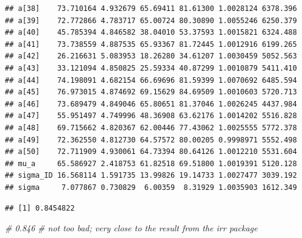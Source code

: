 \documentclass[
]{article}
\newenvironment{Shaded}{\begin{snugshade}}{\end{snugshade}}
\newcommand{\CommentTok}[1]{\textcolor[rgb]{0.56,0.35,0.01}{\textit{#1}}}
\newcommand{\DecValTok}[1]{\textcolor[rgb]{0.00,0.00,0.81}{#1}}
\newcommand{\FloatTok}[1]{\textcolor[rgb]{0.00,0.00,0.81}{#1}}
\newcommand{\FunctionTok}[1]{\textcolor[rgb]{0.13,0.29,0.53}{\textbf{#1}}}
\newcommand{\NormalTok}[1]{#1}
\newcommand{\OtherTok}[1]{\textcolor[rgb]{0.56,0.35,0.01}{#1}}
\newcommand{\SpecialCharTok}[1]{\textcolor[rgb]{0.81,0.36,0.00}{\textbf{#1}}}
\begin{document}
\begin{verbatim}
## a[38]    73.710164 4.932679 65.69411 81.61300 1.0028124 6378.396
## a[39]    72.772866 4.783717 65.00724 80.30890 1.0055246 6250.379
## a[40]    45.785394 4.846582 38.04010 53.37593 1.0015821 6324.488
## a[41]    73.738559 4.887535 65.93367 81.72445 1.0012916 6199.265
## a[42]    26.216631 5.083953 18.26280 34.61207 1.0030459 5052.563
## a[43]    33.121094 4.850825 25.59334 40.87299 1.0010879 5411.410
## a[44]    74.198091 4.682154 66.69696 81.59399 1.0070692 6485.594
## a[45]    76.973015 4.874692 69.15629 84.69509 1.0010603 5720.713
## a[46]    73.689479 4.849046 65.80651 81.37046 1.0026245 4437.984
## a[47]    55.951497 4.749996 48.36908 63.62176 1.0014202 5516.828
## a[48]    69.715662 4.820367 62.00446 77.43062 1.0025555 5772.378
## a[49]    72.362550 4.812730 64.57572 80.00205 0.9998971 5552.498
## a[50]    72.711909 4.930061 64.73394 80.64126 1.0012210 5531.604
## mu_a     65.586927 2.418753 61.82518 69.51800 1.0019391 5120.128
## sigma_ID 16.568114 1.591735 13.99826 19.14733 1.0027477 3039.192
## sigma     7.077867 0.730829  6.00359  8.31929 1.0035903 1612.349
\end{verbatim}

\begin{Shaded}
\end{Shaded}

\begin{verbatim}
## [1] 0.8454822
\end{verbatim}

\begin{Shaded}
\begin{Highlighting}[]
\CommentTok{\# 0.846}
\CommentTok{\# not too bad; very close to the result from the irr package}
\end{Highlighting}
\end{Shaded}
\end{document}
